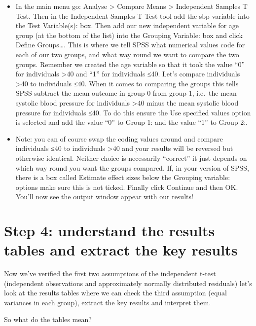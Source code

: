 \documentclass[
]{book}
\begin{document}
\begin{itemize}
\item
  In the main menu go: Analyse \textgreater{} Compare Means \textgreater{} Independent Samples T Test. Then in the Independent-Samples T Test tool add the sbp variable into the Test Variable(s): box. Then add our new independent variable for age group (at the bottom of the list) into the Grouping Variable: box and click Define Groups\ldots{}. This is where we tell SPSS what numerical values code for each of our two groups, and what way round we want to compare the two groups. Remember we created the age variable so that it took the value ``0'' for individuals \textgreater40 and ``1'' for individuals ≤40. Let's compare individuals \textgreater40 to individuals ≤40. When it comes to comparing the groups this tells SPSS subtract the mean outcome in group 0 from group 1, i.e.~the mean systolic blood pressure for individuals \textgreater40 minus the mean systolic blood pressure for individuals ≤40. To do this ensure the Use specified values option is selected and add the value ``0'' to Group 1: and the value ``1'' to Group 2:.
\item
  Note: you can of course swap the coding values around and compare individuals ≤40 to individuals \textgreater40 and your results will be reversed but otherwise identical. Neither choice is necessarily ``correct'' it just depends on which way round you want the groups compared. If, in your version of SPSS, there is a box called Estimate effect sizes below the Grouping variable: options make sure this is not ticked. Finally click Continue and then OK. You'll now see the output window appear with our results!
\end{itemize}

\hypertarget{step-4-understand-the-results-tables-and-extract-the-key-results}{%
\section{Step 4: understand the results tables and extract the key results}\label{step-4-understand-the-results-tables-and-extract-the-key-results}}

Now we've verified the first two assumptions of the independent t-test (independent observations and approximately normally distributed residuals) let's look at the results tables where we can check the third assumption (equal variances in each group), extract the key results and interpret them.

So what do the tables mean?
\end{document}
